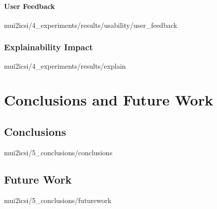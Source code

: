 \documentclass[english,epsbased,copyright,final,printable,covers,extendedindex,firstnumbered,tfm,gnuplot,loc,loe,lof,lot]{tfgtfmthesisuam}
\begin{document}
        \subsubsection{User Feedback\label{SSS:USERFEEDBACK}}{mui2icsi/4_experiments/results/usability/user_feedback}
      \subsection{Explainability Impact\label{SS:EXPLAIN}}{mui2icsi/4_experiments/results/explain}

  \chapter{Conclusions and Future Work\label{CAP:CONCLUSIONS}}
    \section{Conclusions\label{SEC:CONCLUSIONS}}{mui2icsi/5_conclusions/conclusions}

    \section{Future Work\label{SEC:FUTUREWORK}}{mui2icsi/5_conclusions/futurework}

  \appendix
\end{document}
